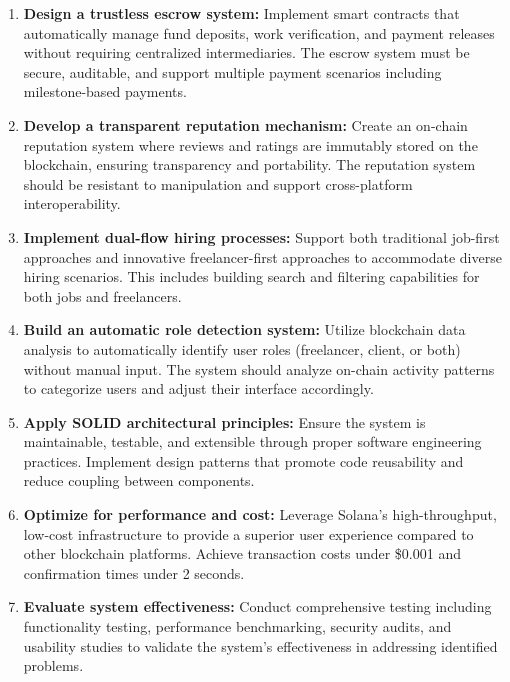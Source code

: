 \documentclass[a4paper,13pt,twoside]{report}
\theoremstyle{definition}
\begin{document}
\begin{enumerate}
    \item \textbf{Design a trustless escrow system:} Implement smart contracts that automatically manage fund deposits, work verification, and payment releases without requiring centralized intermediaries. The escrow system must be secure, auditable, and support multiple payment scenarios including milestone-based payments.

    \item \textbf{Develop a transparent reputation mechanism:} Create an on-chain reputation system where reviews and ratings are immutably stored on the blockchain, ensuring transparency and portability. The reputation system should be resistant to manipulation and support cross-platform interoperability.

    \item \textbf{Implement dual-flow hiring processes:} Support both traditional job-first approaches and innovative freelancer-first approaches to accommodate diverse hiring scenarios. This includes building search and filtering capabilities for both jobs and freelancers.

    \item \textbf{Build an automatic role detection system:} Utilize blockchain data analysis to automatically identify user roles (freelancer, client, or both) without manual input. The system should analyze on-chain activity patterns to categorize users and adjust their interface accordingly.

    \item \textbf{Apply SOLID architectural principles:} Ensure the system is maintainable, testable, and extensible through proper software engineering practices. Implement design patterns that promote code reusability and reduce coupling between components.

    \item \textbf{Optimize for performance and cost:} Leverage Solana's high-throughput, low-cost infrastructure to provide a superior user experience compared to other blockchain platforms. Achieve transaction costs under \$0.001 and confirmation times under 2 seconds.

    \item \textbf{Evaluate system effectiveness:} Conduct comprehensive testing including functionality testing, performance benchmarking, security audits, and usability studies to validate the system's effectiveness in addressing identified problems.
\end{enumerate}
\end{document}
